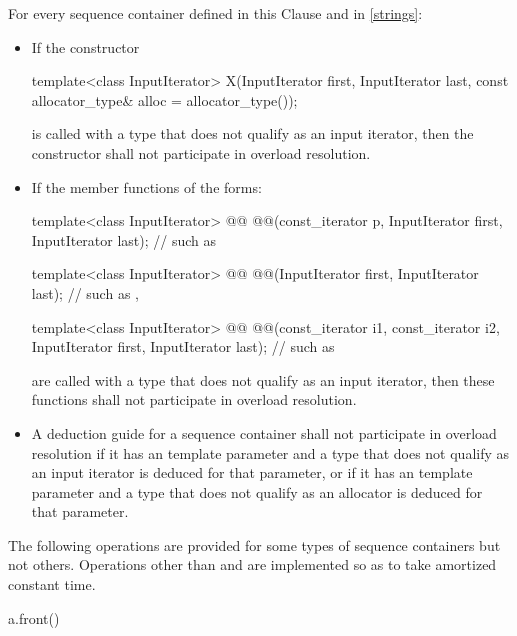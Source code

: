 \pnum
For every sequence container defined in this Clause and in \ref{strings}:
\begin{itemize}
\item If the constructor
\begin{codeblock}
template<class InputIterator>
  X(InputIterator first, InputIterator last,
    const allocator_type& alloc = allocator_type());
\end{codeblock}
is called with a type  that does not qualify as an input
iterator, then the constructor
shall not participate in overload resolution.

\item If the member functions of the forms:
\begin{codeblock}
template<class InputIterator>
  @@ @@(const_iterator p,
                InputIterator first, InputIterator last);       // such as 

template<class InputIterator>
  @@ @@(InputIterator first, InputIterator last);       // such as , 

template<class InputIterator>
  @@ @@(const_iterator i1, const_iterator i2,
                InputIterator first, InputIterator last);       // such as 
\end{codeblock}
are called with a type  that does not qualify as an input
iterator, then these functions
shall not participate in overload resolution.

\item A deduction guide for a sequence container shall not participate in overload resolution
if it has an  template parameter and a type that does not
qualify as an input iterator is deduced for that parameter,
or if it has an  template parameter and a type that does not
qualify as an allocator is deduced for that parameter.
\end{itemize}

\pnum
The following operations are provided for
some types of sequence containers but not others.
Operations other than  and 
are implemented so as to take amortized constant time.

\begin{itemdecl}
a.front()
\end{itemdecl}

